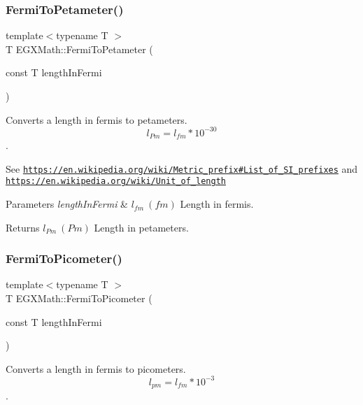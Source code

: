 \subsubsection{\texorpdfstring{Fermi\+To\+Petameter()}{FermiToPetameter()}}
{\footnotesize\ttfamily template$<$typename T $>$ \\
T E\+G\+X\+Math\+::\+Fermi\+To\+Petameter (\begin{DoxyParamCaption}\item[{const T}]{length\+In\+Fermi }\end{DoxyParamCaption})}



Converts a length in fermis to petameters. \[ l_{Pm}=l_{fm} * 10^{-30} \]. 

See \href{https://en.wikipedia.org/wiki/Metric_prefix#List_of_SI_prefixes}{\tt https\+://en.\+wikipedia.\+org/wiki/\+Metric\+\_\+prefix\#\+List\+\_\+of\+\_\+\+S\+I\+\_\+prefixes} and \href{https://en.wikipedia.org/wiki/Unit_of_length}{\tt https\+://en.\+wikipedia.\+org/wiki/\+Unit\+\_\+of\+\_\+length} 
\begin{DoxyParams}{Parameters}
{\em length\+In\+Fermi} & $ l_{fm}\ (fm)$ Length in fermis. \\
\hline
\end{DoxyParams}
\begin{DoxyReturn}{Returns}
$ l_{Pm}\ (Pm)$ Length in petameters. 
\end{DoxyReturn}
\mbox{\label{group___e_g_x_math-_conversions-_length_conversions-_non-_s_i-_fermi-_s_i_ga9d12cf46e802908b3ee6f6e1c4d8047e}} 
\subsubsection{\texorpdfstring{Fermi\+To\+Picometer()}{FermiToPicometer()}}
{\footnotesize\ttfamily template$<$typename T $>$ \\
T E\+G\+X\+Math\+::\+Fermi\+To\+Picometer (\begin{DoxyParamCaption}\item[{const T}]{length\+In\+Fermi }\end{DoxyParamCaption})}



Converts a length in fermis to picometers. \[ l_{pm}=l_{fm} * 10^{-3} \]. 

